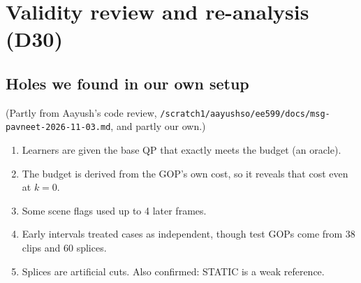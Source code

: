 \documentclass[10pt,a4paper]{article}
\newcommand{\code}[1]{\texttt{\small #1}}
\begin{document}
\section{Validity review and re-analysis (D30)}\label{sec:reanalysis}
\subsection{Holes we found in our own setup}
(Partly from Aayush's code review, \code{/scratch1/aayushso/ee599/docs/msg-pavneet-2026-11-03.md}, and partly our own.)
\begin{enumerate}
\item Learners are given the base QP that exactly meets the budget (an oracle).
\item The budget is derived from the GOP's own cost, so it reveals that cost even at $k=0$.
\item Some scene flags used up to 4 later frames.
\item Early intervals treated cases as independent, though test GOPs come from 38 clips and 60 splices.
\item Splices are artificial cuts. Also confirmed: STATIC is a weak reference.
\end{enumerate}
\end{document}
